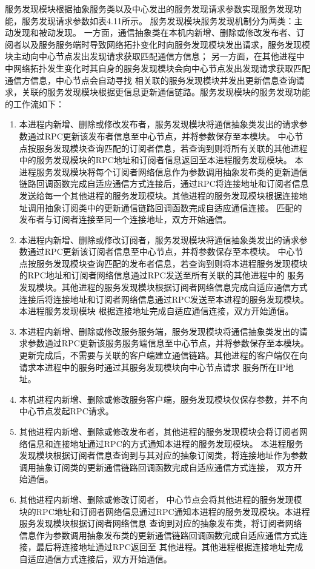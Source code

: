 服务发现模块根据抽象服务类以及中心发出的服务发现请求参数实现服务发现功能，服务发现请求参数如表4.11所示。
服务发现模块服务发现机制分为两类：主动发现和被动发现。
一方面，通信抽象类在本机内新增、删除或修改发布者、订阅者以及服务服务端时导致网络拓扑变化时向服务发现模块发出请求，服务发现模块主动向中心节点发出发现请求获取匹配通信方信息；
另一方面，在其他进程中中网络拓扑发生变化时其自身的服务发现模块会向中心节点发出发现请求获取匹配通信方信息，中心节点会自动寻找
相关联的服务发现模块并发出更新信息查询请求，关联的服务发现模块根据更信息更新通信链路。服务发现模块的服务发现功能的工作流如下：
\begin{enumerate}
  \item 本进程内新增、删除或修改发布者，服务发现模块将通信抽象类发出的请求参数通过RPC更新该发布者信息至中心节点，并将参数保存至本模块。
  中心节点按服务发现模块查询匹配的订阅者信息，若查询到则将所有关联的其他进程中的服务发现模块的RPC地址和订阅者信息返回至本进程服务发现模块。
  本进程服务发现模块将每个订阅者网络信息作为参数调用抽象发布类的更新通信链路回调函数完成自适应通信方式连接后，通过RPC将连接地址和订阅者信息
  发送给每一个其他进程的服务发现模块。其他进程的服务发现模块根据连接地址调用抽象订阅类中的更新通信链路回调函数完成自适应通信连接。
  匹配的发布者与订阅者连接至同一个连接地址，双方开始通信。
  \item 本进程内新增、删除或修改订阅者，服务发现模块将通信抽象类发出的请求参数通过RPC更新该订阅者信息至中心节点，并将参数保存至本模块。
  中心节点按服务发现模块查询匹配的发布者信息，若查询到则将本进程服务发现模块的RPC地址和订阅者网络信息通过RPC发送至所有关联的其他进程中的
  服务发现模块。其他进程的服务发现模块根据订阅者网络信息完成自适应通信方式连接后将连接地址和订阅者网络信息通过RPC发送至本进程的服务发现模块。本进程服务发现模块
  根据连接地址完成自适应通信连接，双方开始通信。
  \item 本进程内新增、删除或修改服务服务端，服务发现模块将通信抽象类发出的请求参数通过RPC更新该服务服务端信息至中心节点，并将参数保存至本模块。
  更新完成后，不需要与关联的客户端建立通信链路。其他进程的客户端仅在向请求本进程中的服务时通过其服务发现模块向中心节点请求
  服务所在IP地址。
  \item 本机进程内新增、删除或修改服务客户端，服务发现模块仅保存参数，并不向中心节点发起RPC请求。
  \item 其他进程内新增、删除或修改发布者，其他进程的服务发现模块会将订阅者网络信息和连接地址通过RPC的方式通知本进程的服务发现模块。
  本进程服务发现模块根据订阅者信息查询到与其对应的抽象订阅类，将连接地址作为参数调用抽象订阅类的更新通信链路回调函数完成自适应通信方式连接，
  双方开始通信。
  \item 其他进程内新增、删除或修改订阅者，
  中心节点会将其他进程的服务发现模块的RPC地址和订阅者网络信息通过RPC通知本进程的服务发现模块。本进程服务发现模块根据订阅者网络信息
  查询到对应的抽象发布类，将订阅者网络信息作为参数调用抽象发布类的更新通信链路回调函数完成自适应通信方式连接，最后将连接地址通过RPC返回至
  其他进程。其他进程根据连接地址完成自适应通信方式连接后，双方开始通信。
\end{enumerate}


